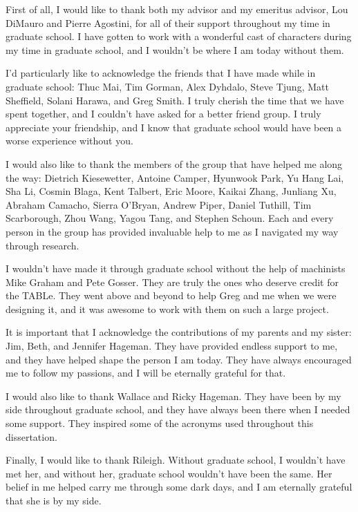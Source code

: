 \begin{acknowledgments}

First of all, I would like to thank both my advisor and my emeritus advisor, Lou DiMauro and Pierre Agostini, for all of their support throughout my time in graduate school. I have gotten to work with a wonderful cast of characters during my time in graduate school, and I wouldn't be where I am today without them.

I'd particularly like to acknowledge the friends that I have made while in graduate school: Thuc Mai, Tim Gorman, Alex Dyhdalo, Steve Tjung, Matt Sheffield, Solani Harawa, and Greg Smith.  I truly cherish the time that we have spent together, and I couldn't have asked for a better friend group.  I truly appreciate your friendship, and I know that graduate school would have been a worse experience without you.

I would also like to thank the members of the group that have helped me along the way: Dietrich Kiesewetter, Antoine Camper, Hyunwook Park, Yu Hang Lai, Sha Li, Cosmin Blaga, Kent Talbert, Eric Moore, Kaikai Zhang, Junliang Xu, Abraham Camacho, Sierra O'Bryan, Andrew Piper, Daniel Tuthill, Tim Scarborough, Zhou Wang, Yagou Tang, and Stephen Schoun.  Each and every person in the group has provided invaluable help to me as I navigated my way through research.

I wouldn't have made it through graduate school without the help of machinists Mike Graham and Pete Gosser.  They are truly the ones who deserve credit for the TABLe.  They went above and beyond to help Greg and me when we were designing it, and it was awesome to work with them on such a large project.

It is important that I acknowledge the contributions of my parents and my sister: Jim, Beth, and Jennifer Hageman.  They have provided endless support to me, and they have helped shape the person I am today.  They have always encouraged me to follow my passions, and I will be eternally grateful for that.

I would also like to thank Wallace and Ricky Hageman.  They have been by my side throughout graduate school, and they have always been there when I needed some support. They inspired some of the acronyms used throughout this dissertation.

Finally, I would like to thank Rileigh.  Without graduate school, I wouldn't have met her, and without her, graduate school wouldn't have been the same.  Her belief in me helped carry me through some dark days, and I am eternally grateful that she is by my side.




\end{acknowledgments}